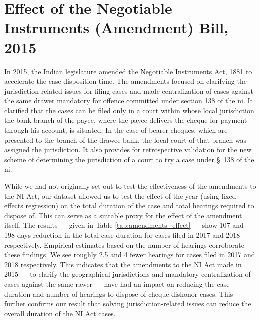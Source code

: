 \documentclass[12pt,a4paper]{article}
\begin{document}
	\section{Effect of the Negotiable Instruments (Amendment) Bill, 2015} \label{sec:2015amend}
	
	In 2015, the Indian legislature amended the Negotiable Instruments Act, 1881 to accelerate the case disposition time. The amendments focused on clarifying the jurisdiction-related issues for	filing cases and made centralization of cases against the same drawer mandatory for offence committed under section 138 of the \gls{ni}. It clarified that the cases can be filed only in a court within whose local jurisdiction the bank branch of the payee, where the payee delivers the cheque for payment through his account, is situated. In the case of bearer cheques, which are presented to the branch of the drawee bank, the local court of that branch was assigned the jurisdiction. It also provides for retrospective validation for the new scheme of determining the jurisdiction of a court to try a case under \S~138 of the \gls{ni}.
	
	While we had not originally set out to test the effectiveness of the amendments to the NI Act, our dataset allowed us to test the effect of the year (using fixed-effects regression) on the total duration of the case and total hearings required to dispose of. This can serve as a suitable proxy for the effect of the amendment itself. The results --- given in Table \ref{tab:amendments_effect} --- show 107 and 198 days reduction in the total case duration for cases filed in 2017 and 2018 respectively. Empirical estimates based on the number of hearings corroborate these findings. We see roughly 2.5 and 4 fewer hearings for cases filed in 2017 and 2018 respectively. This indicates that the amendments to the NI Act made in 2015 --- to clarify the geographical jurisdictions and mandatory centralization of cases against the same rawer --- have had an impact on reducing the case duration and number of hearings to dispose of cheque dishonor cases. This further confirms our result that solving jurisdiction-related issues can reduce the overall duration of the NI Act cases.
	
\end{document}
